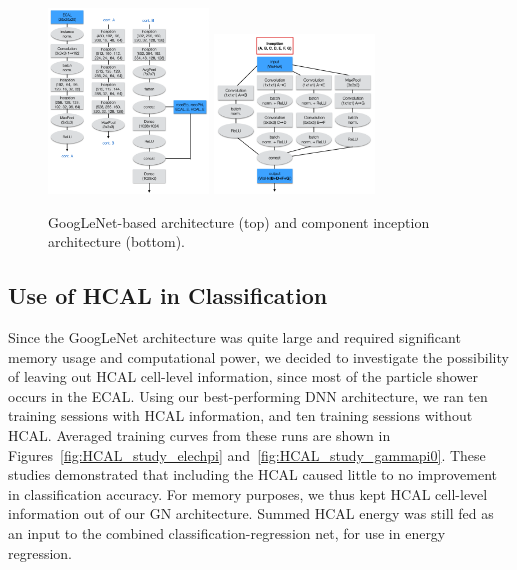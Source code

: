\begin{figure}[htbp]
\centering
\includegraphics[width=0.38\textwidth]{Images/Calo/GN_architecture.png}
\includegraphics[width=0.38\textwidth]{Images/Calo/inception_architecture.png}
\caption{GoogLeNet-based architecture (top) and component inception architecture (bottom).
}
\label{fig:gn_with_inceptin}
\end{figure}

\subsection*{Use of HCAL in Classification}\label{app:classification_HCAL}

Since the GoogLeNet architecture was quite large and required significant memory usage and computational power, we decided to investigate the possibility of leaving out HCAL cell-level information, since most of the particle shower occurs in the ECAL. Using our best-performing DNN architecture, we ran ten training sessions with HCAL information, and ten training sessions without HCAL. Averaged training curves from these runs are shown in Figures~\ref{fig:HCAL_study_elechpi} and~\ref{fig:HCAL_study_gammapi0}. These studies demonstrated that including the HCAL caused little to no improvement in classification accuracy. For memory purposes, we thus kept HCAL cell-level information out of our GN architecture. Summed HCAL energy was still fed as an input to the combined classification-regression net, for use in energy regression.


